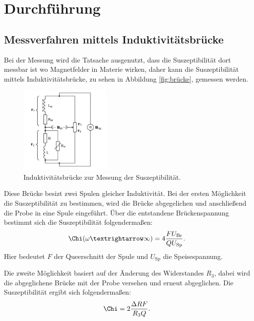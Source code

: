 \section{Durchführung}
\label{sec:Durchführung}
\subsection{Messverfahren mittels Induktivitätsbrücke}
Bei der Messung wird die Tatsache ausgenutzt, dass die Suszeptibilität dort messbar ist wo Magnetfelder in Materie
wirken, daher kann die Suszeptibilität mittels Induktivitätsbrücke, zu sehen in Abbildung \ref{fig:brücke}, gemessen werden.
\begin{figure}
  \centering
  \includegraphics[width=0.4\textwidth]{bruecke.PNG}
  \caption{Induktivitätsbrücke zur Messung der Suszeptibilität. }
  \label{fig:bruecke}
\end{figure}
Diese Brücke besizt zwei Spulen gleicher Induktivität.
Bei der ersten Möglichkeit die Suszeptibilität zu bestimmen, wird die Brücke abgegelichen und anschließend die Probe in eine Spule eingeführt.
Über die entstandene Brückenspannung bestimmt sich die Suszeptibilität folgendermaßen:
\begin{align}
 \Chi(\omega\textrightarrow\infty)=4\frac{FU_\mathrm{Br}}{QU_\mathrm{Sp}}.
\end{align}
Hier bedeutet $F$ der Queerschnitt der Spule und $U_\mathrm{Sp}$ die Speisespannung.

Die zweite Möglichkeit basiert auf der Änderung des Widerstandes $R_3$, dabei wird die abgeglichene Brücke mit der Probe versehen
und erneut abgeglichen. Die Suszeptibilität ergibt sich folgendermaßen:
\begin{align}
\Chi=2\frac{\Delta R F}{R_\mathrm{3} Q}.
\end{align}



